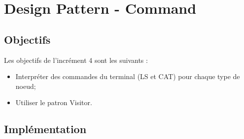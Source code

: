 
\newpage
\section{Design Pattern - Command}

\subsection{Objectifs}

Les objectifs de l'incrément 4 sont les suivants :\\
\begin{itemize}
\item Interpréter des commandes du terminal (LS et CAT) pour chaque type de noeud;
\item Utiliser le patron Visitor.\\
\end{itemize}

\subsection{Implémentation}